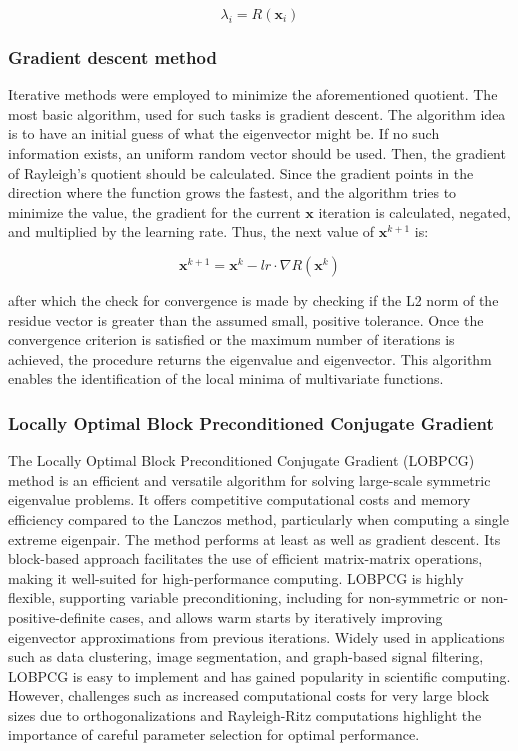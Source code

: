 \begin{equation}
	\lambda_i = R(\textbf{x}_i)
\end{equation}

\noindent

\subsubsection{Gradient descent method}
Iterative methods were employed to minimize the aforementioned quotient. The most basic algorithm, used for such tasks is gradient descent.\cite{gradient_descent} The algorithm idea is to have an initial guess of what the eigenvector might be. If no such information exists, an uniform random vector should be used. Then, the gradient of Rayleigh's quotient should be calculated. Since the gradient points in the direction where the function grows the fastest, and the algorithm tries to minimize the value, the gradient for the current $\textbf{x}$ iteration is calculated, negated, and multiplied by the learning rate. Thus, the next value of $\textbf{x}^{k+1}$ is:

\begin{equation}
	\textbf{x}^{k+1} = \textbf{x}^{k} - lr \cdot \nabla R(\textbf{x}^{k})
\end{equation}

\noindent after which the check for convergence is made by checking if the L2 norm of the residue vector is greater than the assumed small, positive tolerance. Once the convergence criterion is satisfied or the maximum number of iterations is achieved, the procedure returns the eigenvalue and eigenvector. This algorithm enables the identification of the local minima of multivariate functions.

\subsubsection{Locally Optimal Block Preconditioned Conjugate Gradient}

The Locally Optimal Block Preconditioned Conjugate Gradient (LOBPCG) method is an efficient and versatile algorithm for solving large-scale symmetric eigenvalue problems. It offers competitive computational costs and memory efficiency compared to the Lanczos method, particularly when computing a single extreme eigenpair. The method performs at least as well as gradient descent.\cite{knyazew2001} Its block-based approach facilitates the use of efficient matrix-matrix operations, making it well-suited for high-performance computing. LOBPCG is highly flexible, supporting variable preconditioning, including for non-symmetric or non-positive-definite cases, and allows warm starts by iteratively improving eigenvector approximations from previous iterations. Widely used in applications such as data clustering, image segmentation, and graph-based signal filtering, LOBPCG is easy to implement and has gained popularity in scientific computing. However, challenges such as increased computational costs for very large block sizes due to orthogonalizations and Rayleigh-Ritz computations highlight the importance of careful parameter selection for optimal performance.\cite{knyazew2017}

